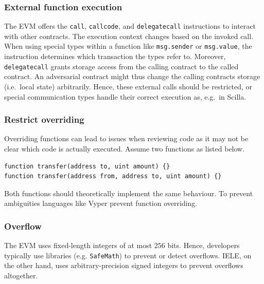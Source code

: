 \subsubsection{External function execution}
The EVM offers the \texttt{call}, \texttt{callcode}, and \texttt{delegatecall} instructions to interact with other contracts. The execution context changes based on the invoked call. When using special types within a function like \texttt{msg.sender} or \texttt{msg.value}, the instruction determines which transaction the types refer to. Moreover, \texttt{delegatecall} grants storage access from the calling contract to the called contract. An adversarial contract might thus change the calling contracts storage (i.e.\ local state) arbitrarily. Hence, these external calls should be restricted, or special communication types handle their correct execution as, e.g.\ in Scilla.



\subsubsection{Restrict overriding}
Overriding functions can lead to issues when reviewing code as it may not be clear which code is actually executed. Assume two functions as listed below.
\begin{lstlisting}[caption={Function overriding with different inputs.},label=lst:tail-call,language=Solidity]
function transfer(address to, uint amount) {}
function transfer(address from, address to, uint amount) {}
\end{lstlisting}
Both functions should theoretically implement the same behaviour. To prevent ambiguities languages like Vyper prevent function overriding.

\subsubsection{Overflow}
The EVM uses fixed-length integers of at most 256 bits.
Hence, developers typically use libraries (e.g. \texttt{SafeMath}) to prevent or detect overflows.
IELE, on the other hand, uses arbitrary-precision signed integers to prevent overflows altogether.

